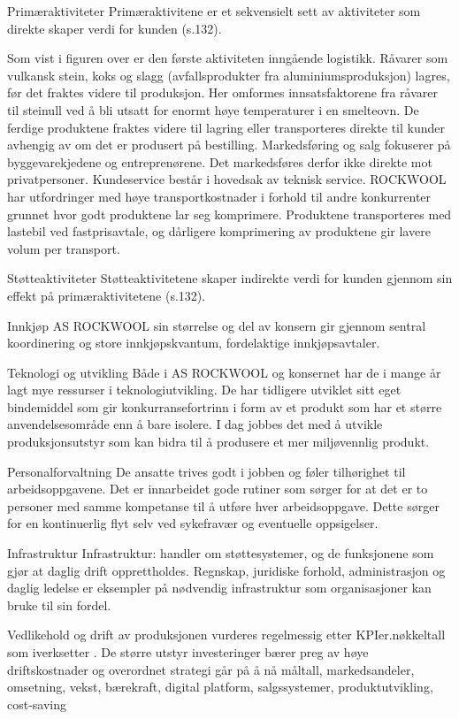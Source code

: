 Primæraktiviteter
Primæraktivitene er et sekvensielt sett av aktiviteter som direkte skaper verdi for kunden (s.132). 
  
Som vist i figuren over er den første aktiviteten inngående logistikk. Råvarer som vulkansk stein, koks og slagg (avfallsprodukter fra aluminiumsproduksjon) lagres, før det fraktes videre til produksjon. Her omformes innsatsfaktorene fra råvarer til steinull ved å bli utsatt for enormt høye temperaturer i en smelteovn. De ferdige produktene fraktes videre til lagring eller transporteres direkte til kunder avhengig av om det er produsert på bestilling. Markedsføring og salg fokuserer på byggevarekjedene og entreprenørene. Det markedsføres derfor ikke direkte mot privatpersoner. Kundeservice består i hovedsak av teknisk service.
ROCKWOOL har utfordringer med høye transportkostnader i forhold til andre konkurrenter grunnet hvor godt produktene lar seg komprimere. Produktene transporteres med lastebil ved fastprisavtale, og dårligere komprimering av produktene gir lavere volum per transport. 

Støtteaktiviteter
Støtteaktivitetene skaper indirekte verdi for kunden gjennom sin effekt på primæraktivitetene (s.132). 

Innkjøp
AS ROCKWOOL sin størrelse og del av konsern gir gjennom sentral koordinering og store innkjøpskvantum, fordelaktige innkjøpsavtaler.

Teknologi og utvikling
Både i AS ROCKWOOL og konsernet har de i mange år lagt mye ressurser i teknologiutvikling. De har tidligere utviklet sitt eget bindemiddel som gir konkurransefortrinn i form av et produkt som har et større anvendelsesområde enn å bare isolere. I dag jobbes det med å utvikle produksjonsutstyr som kan bidra til å produsere et mer miljøvennlig produkt.

Personalforvaltning
De ansatte trives godt i jobben og føler tilhørighet til arbeidsoppgavene. Det er innarbeidet gode rutiner som sørger for at det er to personer med samme kompetanse til å utføre hver arbeidsoppgave. Dette sørger for en kontinuerlig flyt selv ved sykefravær og eventuelle oppsigelser. 

Infrastruktur
Infrastruktur: handler om støttesystemer, og de funksjonene som gjør at daglig drift opprettholdes. Regnskap, juridiske forhold, administrasjon og daglig ledelse er eksempler på nødvendig infrastruktur som organisasjoner kan bruke til sin fordel.

Vedlikehold og drift av produksjonen vurderes regelmessig etter KPIer.nøkkeltall som iverksetter . De større utstyr investeringer bærer preg av høye driftskostnader og overordnet strategi går på å nå måltall, markedsandeler, omsetning, vekst, bærekraft, digital platform, salgssystemer, produktutvikling, cost-saving
  
